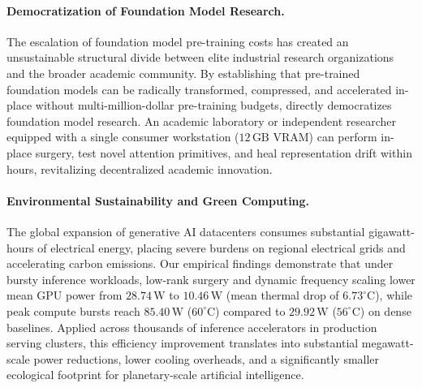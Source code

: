 \paragraph{Democratization of Foundation Model Research.}
The escalation of foundation model pre-training costs has created an unsustainable structural divide between elite industrial research organizations and the broader academic community.
By establishing that pre-trained foundation models can be radically transformed, compressed, and accelerated in-place without multi-million-dollar pre-training budgets, \neuralops{} directly democratizes foundation model research.
An academic laboratory or independent researcher equipped with a single consumer workstation ($12\,\text{GB}$ VRAM) can perform in-place surgery, test novel attention primitives, and heal representation drift within hours, revitalizing decentralized academic innovation.

\paragraph{Environmental Sustainability and Green Computing.}
The global expansion of generative AI datacenters consumes substantial gigawatt-hours of electrical energy, placing severe burdens on regional electrical grids and accelerating carbon emissions.
Our empirical findings demonstrate that under bursty inference workloads, low-rank surgery and dynamic frequency scaling lower mean GPU power from $28.74\,\text{W}$ to $10.46\,\text{W}$ (mean thermal drop of $6.73^\circ\text{C}$), while peak compute bursts reach $85.40\,\text{W}$ ($60^\circ\text{C}$) compared to $29.92\,\text{W}$ ($56^\circ\text{C}$) on dense baselines.
Applied across thousands of inference accelerators in production serving clusters, this efficiency improvement translates into substantial megawatt-scale power reductions, lower cooling overheads, and a significantly smaller ecological footprint for planetary-scale artificial intelligence.

